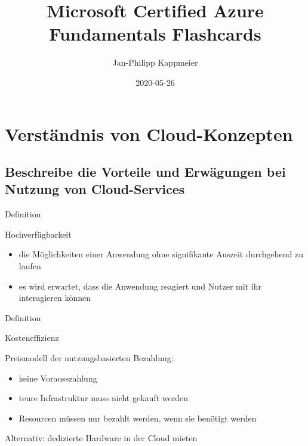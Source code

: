 \documentclass{scrartcl}
\newenvironment{flashcard}[2][]{%
    #1
    \vfill
    \centerline{\Large{#2}}
    \vfill
\newpage
}
{\newpage}
\newcommand{\sectioncard}[1]{
    \vspace*{\stretch{1}}
    \section{#1}
    \vspace*{\stretch{1}}
    \pagebreak
}
\newcommand{\subsectioncard}[1]{
    \vspace*{\stretch{1}}
    \subsection{#1}
    \vspace*{\stretch{1}}
    \pagebreak
}
\begin{document}
    \title{Microsoft Certified Azure Fundamentals Flashcards}
    \date{2020-05-26}
    \author{Jan-Philipp Kappmeier}

    \clearpage\maketitle
    \thispagestyle{empty}
    \pagebreak

    \sectioncard{Verständnis von Cloud-Konzepten}

    \subsectioncard{Beschreibe die Vorteile und Erwägungen bei Nutzung von Cloud-Services}

    \begin{flashcard}[Definition]{Hochverfügbarkeit}
        \begin{itemize}
            \item die Möglichkeiten einer Anwendung ohne signifikante Auszeit durchgehend zu laufen
            \item es wird erwartet, dass die Anwendung reagiert und Nutzer mit ihr interagieren können
        \end{itemize}
    \end{flashcard}

    \begin{flashcard}[Definition]{Kosteneffizienz}
        Preismodell der nutzungsbasierten Bezahlung:
        \begin{itemize}
            \item keine Vorausszahlung
            \item teure Infrastruktur muss nicht gekauft werden
            \item Resourcen müssen nur bezahlt werden, wenn sie benötigt werden
        \end{itemize}

        \vspace{5mm}
        Alternativ: dedizierte Hardware in der Cloud mieten
    \end{flashcard}
\end{document}
